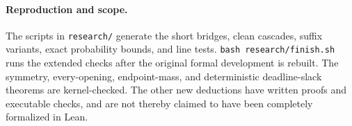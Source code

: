 \paragraph{Reproduction and scope.}
The scripts in \texttt{research/} generate the short bridges, clean
cascades, suffix variants, exact probability bounds, and line tests.
\texttt{bash research/finish.sh} runs the extended checks after the
original formal development is rebuilt. The symmetry, every-opening,
endpoint-mass, and deterministic deadline-slack theorems are kernel-checked. The other new deductions
have written proofs and executable checks, and are not thereby claimed
to have been completely formalized in Lean.
